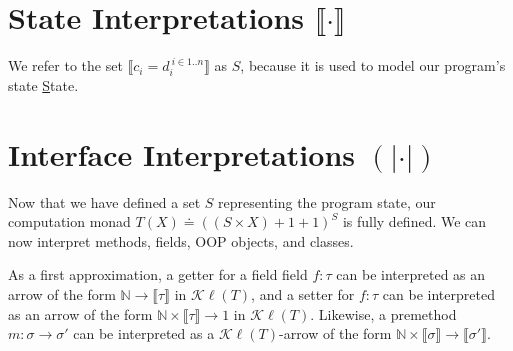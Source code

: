\documentclass{article}
\newcommand{\mbf}{\mathbf}
\newcommand{\sem}[1]{\llbracket #1 \rrbracket}
\newcommand{\csem}[1]{( \! | #1 | \! )}
\begin{document}
\section{State Interpretations $\sem{\cdot}$}




We refer to the set $\sem{c_i = d_i^{~i \in 1..n}}$ as $S$, because it is used to model our program's state 
\underline{S}tate.


\section{Interface Interpretations $\csem{\cdot}$}

Now that we have defined a set $S$ representing the program state, our computation monad
$T(X) \doteq ((S \times X) + 1 + 1)^S$ is fully defined.
We can now interpret methods, fields, OOP objects, and classes.


As a first approximation, a getter for a field field $f : \tau$ can be interpreted as an arrow of the form 
$\mathbb N \to \sem{\tau}$ in $\mathcal K \ell(T)$, and a setter for $f : \tau$ can be interpreted as an arrow
of the form $\mathbb N \times \sem{\tau} \to 1$ in $\mathcal K \ell(T)$. Likewise, a premethod 
$m : \sigma \to \sigma'$ can be interpreted as a $\mathcal K \ell(T)$-arrow of the form $\mathbb N \times \sem{\sigma} \to \sem{\sigma'}$.
\end{document}

